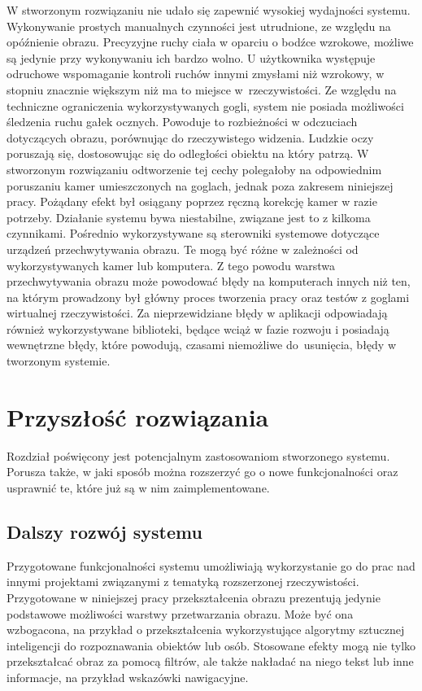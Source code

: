 \documentclass[a4paper,11pt,twoside]{report}
\theoremstyle{definition}
\begin{document}
W stworzonym rozwiązaniu nie udało się zapewnić wysokiej wydajności systemu. Wykonywanie prostych manualnych czynności jest utrudnione, ze względu na opóźnienie obrazu. Precyzyjne ruchy ciała w oparciu o bodźce wzrokowe, możliwe są jedynie przy wykonywaniu ich bardzo wolno. U użytkownika występuje odruchowe wspomaganie kontroli ruchów innymi zmysłami niż wzrokowy, w stopniu znacznie większym niż ma to miejsce w~rzeczywistości. Ze względu na techniczne ograniczenia wykorzystywanych gogli, system nie posiada możliwości śledzenia ruchu gałek ocznych. Powoduje to rozbieżności w odczuciach dotyczących obrazu, porównując do rzeczywistego widzenia. Ludzkie oczy poruszają się, dostosowując się do odległości obiektu na który patrzą. W stworzonym rozwiązaniu odtworzenie tej cechy polegałoby na odpowiednim poruszaniu kamer umieszczonych na goglach, jednak poza zakresem niniejszej pracy. Pożądany efekt był osiągany poprzez ręczną korekcję kamer w razie potrzeby. Działanie systemu bywa niestabilne, związane jest to z kilkoma czynnikami. Pośrednio wykorzystywane są sterowniki systemowe dotyczące urządzeń przechwytywania obrazu. Te mogą być różne w zależności od wykorzystywanych kamer lub komputera. Z tego powodu warstwa przechwytywania obrazu może powodować błędy na komputerach innych niż ten, na którym prowadzony był główny proces tworzenia pracy oraz testów z goglami wirtualnej rzeczywistości. Za nieprzewidziane błędy w aplikacji odpowiadają również wykorzystywane biblioteki, będące wciąż w fazie rozwoju i posiadają wewnętrzne błędy, które powodują, czasami niemożliwe do~usunięcia, błędy w tworzonym systemie.

\chapter{Przyszłość rozwiązania}

Rozdział poświęcony jest potencjalnym zastosowaniom stworzonego systemu. Porusza także, w jaki sposób można rozszerzyć go o nowe funkcjonalności oraz usprawnić te, które już są w nim zaimplementowane.

\section{Dalszy rozwój systemu}

Przygotowane funkcjonalności systemu umożliwiają wykorzystanie go do prac nad innymi projektami związanymi z tematyką rozszerzonej rzeczywistości. Przygotowane w niniejszej pracy przekształcenia obrazu prezentują jedynie podstawowe możliwości warstwy przetwarzania obrazu. Może być ona wzbogacona, na przykład o przekształcenia wykorzystujące algorytmy sztucznej inteligencji do rozpoznawania obiektów lub osób. Stosowane efekty mogą nie tylko przekształcać obraz za pomocą filtrów, ale także nakładać na niego tekst lub inne informacje, na przykład wskazówki nawigacyjne.
\end{document}
